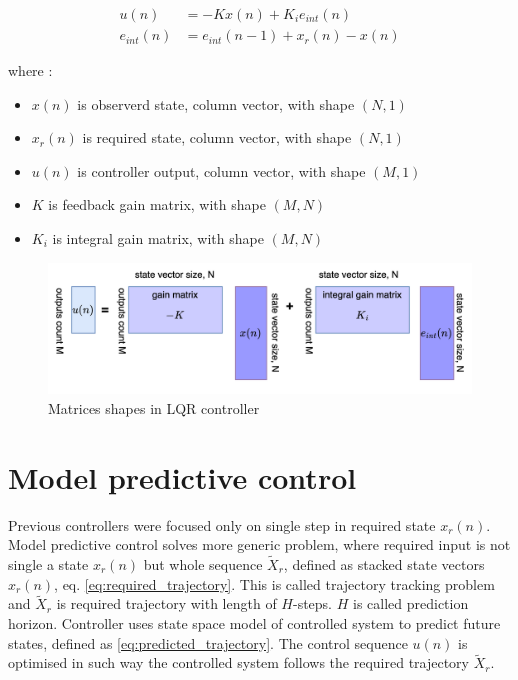 \documentclass[12pt,twoside,onecolumn,openany,extrafontsizes,dvipsnames]{memoir}
\begin{document}
        \begin{align}
            u(n)&= -Kx(n) + K_ie_{int}(n) \label{eq:lqr_integral_action} \\
            e_{int}(n)& = e_{int}(n-1) + x_r(n) - x(n) \nonumber
        \end{align}

        where : 
        \begin{itemize}
            \item $x(n)$ is observerd state, column vector, with shape $(N, 1)$
            \item $x_r(n)$ is required state, column vector, with shape $(N, 1)$
            \item $u(n)$ is controller output, column vector, with shape $(M, 1)$
            \item $K$ is feedback gain matrix, with shape $(M, N)$
            \item $K_i$ is integral gain matrix, with shape $(M, N)$ 
        \end{itemize}


        \begin{figure}[!htb]
            \centering
            \includegraphics[scale=0.8]{../diagrams/control_generic/control_generic-lqr_detail.png}
            \caption{Matrices shapes in LQR controller}
            \label{fig:control_lqr_matrices_shape}
        \end{figure}
        
    \newpage
    \section{Model predictive control}

        Previous controllers were focused only on single step in required state $x_r(n)$.
        Model predictive control solves more generic problem, where required input 
        is not single a state $x_r(n)$ but whole sequence $\tilde{X}_r$,
        defined as stacked state vectors $x_r(n)$, eq. \ref{eq:required_trajectory}. 
        This is called trajectory tracking problem and $\tilde{X}_r$ is required trajectory with length of $H$-steps.
        $H$ is called prediction horizon. Controller uses state space model of controlled system to predict
        future states, defined as \ref{eq:predicted_trajectory}. The control sequence $u(n)$ is optimised in such way the controlled system follows the required 
        trajectory $\tilde{X}_r$. 
\end{document}

